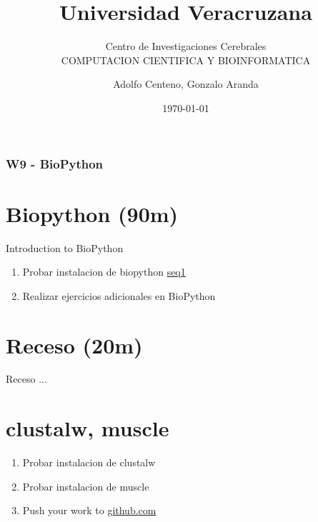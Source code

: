 \documentclass{beamer}
\begin{document}
\title{Universidad Veracruzana}  
\subtitle{Centro de Investigaciones Cerebrales\\COMPUTACION CIENTIFICA Y BIOINFORMATICA}
\author{Adolfo Centeno, Gonzalo Aranda}
\date{\today} 

\begin{frame}
\titlepage
\end{frame}

\begin{frame}\frametitle{W9 - BioPython }
\tableofcontents
\end{frame} 


\section{Biopython (90m) }

\begin{frame}

Introduction to BioPython

\begin{enumerate}

\item

	Probar instalacion de biopython \href{https://github.com/adsoftsito/python/blob/master/w9/seq1.py}{seq1} 
	
\item
	Realizar ejercicios adicionales en BioPython
	
\end{enumerate} 


\end{frame}


\section{Receso  (20m) }

\begin{frame}


Receso ...

\end{frame}


\section{clustalw, muscle }

\begin{frame}

\begin{enumerate}

\item 
    Probar instalacion de clustalw 
\item 
	Probar instalacion de muscle
\item
	Push your work to \href{https://github.com}{github.com}

\end{enumerate} 


\end{frame}
\end{document}
